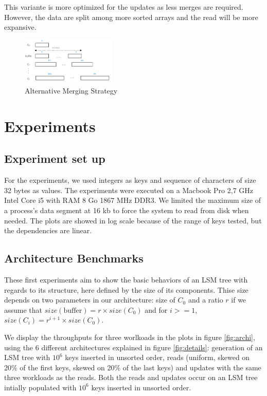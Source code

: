 \documentclass{sig-alternate-05-2015}
\begin{document}
This variante is more optimized for the updates as less merges are required. However, the data are split among more sorted arrays and the read will be more expansive.

\begin{figure}[H]
\begin{center}
    \includegraphics[width=0.4\textwidth]{img/varlsm}
    \caption{Alternative Merging Strategy}
\end{center}
\end{figure}

\section{Experiments}
\subsection{Experiment set up}

For the experiments, we used integers as keys and sequence of characters of size 32 bytes as values. The experiments were executed on a Macbook Pro 2,7 GHz Intel Core i5 with RAM 8 Go 1867 MHz DDR3. We limited the maximum size of a process's data segment at 16 kb to force the system to read from disk when needed. The plots are showed in log scale because of the range of keys tested, but the dependencies are linear.


\subsection{Architecture Benchmarks}

These first experiments aim to show the basic behaviors of an LSM tree with regards to its structure, here defined by the size of its components. Thise size depends on two parameters in our architecture: size of $C_0$ and a ratio $r$ if we assume that $size(\text{buffer}) = r \times size( C_0)$ and for $i>= 1$, $size(C_i) = r^{i+1} \times size(C_0)$.

We display the throughputs for three worlkoads in the plots in figure \ref{fig:archi}, using the 6 different architectures explained in figure \ref{fig:details}: generation of an LSM tree with $10^6$ keys inserted in unsorted order, reads (uniform, skewed on 20\% of the first keys, skewed on 20\% of the last keys) and updates with the same three workloads as the reads. Both the reads and updates occur on an LSM tree intially populated with $10^6$ keys inserted in unsorted order.
\end{document}
